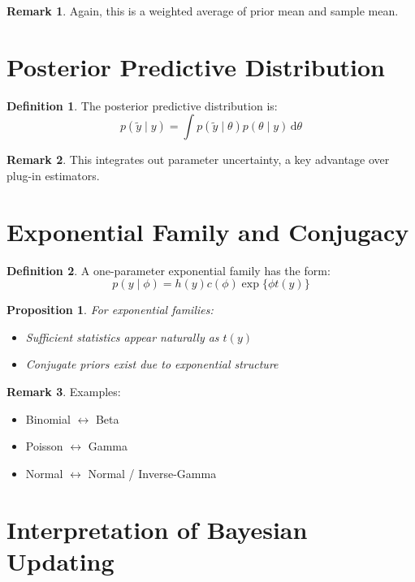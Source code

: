 \documentclass[12pt,oneside]{book}
\numberwithin{equation}{section}
\theoremstyle{definition}
\newtheorem{definition}{Definition}[section]
\newtheorem{remark}{Remark}[section]
\theoremstyle{plain}
\newtheorem{proposition}{Proposition}[section]
\theoremstyle{remark}
\newcommand{\dd}{\,\mathrm{d}}
\begin{document}
\begin{remark}
Again, this is a weighted average of prior mean and sample mean.
\end{remark}

\section{Posterior Predictive Distribution}

\begin{definition}
The posterior predictive distribution is:
$$
p(\tilde{y} \mid y) = \int p(\tilde{y} \mid \theta)p(\theta \mid y)\dd \theta
$$
\end{definition}

\begin{remark}
This integrates out parameter uncertainty, a key advantage over plug-in estimators.
\end{remark}

\section{Exponential Family and Conjugacy}

\begin{definition}
A one-parameter exponential family has the form:
$$
p(y \mid \phi) = h(y)c(\phi)\exp\{\phi t(y)\}
$$
\end{definition}

\begin{proposition}
For exponential families:
\begin{itemize}
    \item Sufficient statistics appear naturally as $t(y)$
    \item Conjugate priors exist due to exponential structure
\end{itemize}
\end{proposition}

\begin{remark}
Examples:
\begin{itemize}
    \item Binomial $\leftrightarrow$ Beta
    \item Poisson $\leftrightarrow$ Gamma
    \item Normal $\leftrightarrow$ Normal / Inverse-Gamma
\end{itemize}
\end{remark}

\section{Interpretation of Bayesian Updating}
\end{document}
